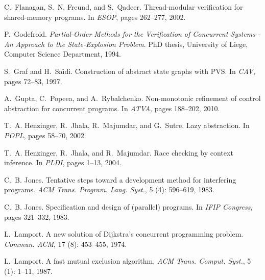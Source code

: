 \documentclass{sigplanconf}
\begin{document}
\begin{thebibliography}{34}
C.~Flanagan, S.~N. Freund, and S.~Qadeer.
\newblock Thread-modular verification for shared-memory programs.
\newblock In \emph{ESOP}, pages 262--277, 2002.

P.~Godefroid.
\newblock \emph{Partial-Order Methods for the Verification of Concurrent
  Systems - An Approach to the State-Explosion Problem}.
\newblock PhD thesis, University of Liege, Computer Science Department, 1994.

S.~Graf and H.~Sa\"{\i}di.
\newblock Construction of abstract state graphs with {PVS}.
\newblock In \emph{CAV}, pages 72--83, 1997.

A.~Gupta, C.~Popeea, and A.~Rybalchenko.
\newblock Non-monotonic refinement of control abstraction for concurrent
  programs.
\newblock In \emph{ATVA}, pages 188--202, 2010.

T.~A. Henzinger, R.~Jhala, R.~Majumdar, and G.~Sutre.
\newblock Lazy abstraction.
\newblock In \emph{POPL}, pages 58--70, 2002.

T.~A. Henzinger, R.~Jhala, and R.~Majumdar.
\newblock Race checking by context inference.
\newblock In \emph{PLDI}, pages 1--13, 2004.

C.~B. Jones.
\newblock Tentative steps toward a development method for interfering programs.
\newblock \emph{ACM Trans. Program. Lang. Syst.}, 5 (4):
  596--619, 1983{}.

C.~B. Jones.
\newblock Specification and design of (parallel) programs.
\newblock In \emph{IFIP Congress}, pages 321--332, 1983{}.

L.~Lamport.
\newblock A new solution of {D}ijkstra's concurrent programming problem.
\newblock \emph{Commun. ACM}, 17 (8): 453--455, 1974.

\vfill\eject

L.~Lamport.
\newblock A fast mutual exclusion algorithm.
\newblock \emph{ACM Trans. Comput. Syst.}, 5 (1): 1--11,
  1987.


\end{thebibliography}
\end{document}

